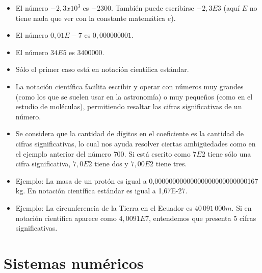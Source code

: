 \documentclass[openany]{book}
\begin{document}
\begin{itemize}
\item
  El número \(-2,3 x 10^3\) es \(-2300\). También puede escribirse \(-2,3E3\) (aquí \(E\) no tiene nada que ver con la constante matemática \(e\)).
\item
  El número \(0,01E-7\) es \(0,000000001\).
\item
  El número \(34E5\) es \(3400000\).
\item
  Sólo el primer caso está en notación científica estándar.
\item
  La notación científica facilita escribir y operar con números muy grandes (como los que se suelen usar en la astronomía) o muy pequeños (como en el estudio de moléculas), permitiendo resaltar las cifras significativas de un número.
\item
  Se considera que la cantidad de dígitos en el coeficiente es la cantidad de cifras significativas, lo cual nos ayuda resolver ciertas ambigüedades como en el ejemplo anterior del número \(700\). Si está escrito como \(7E2\) tiene sólo una cifra significativa, \(7,0E2\) tiene dos y \(7,00E2\) tiene tres.
\item
  Ejemplo: La masa de un protón es igual a 0,00000000000000000000000000167 kg. En notación científica estándar es igual a 1,67E-27.
\item
  Ejemplo: La circunferencia de la Tierra en el Ecuador es \(40 \, 091 \, 000 m\). Si en notación científica aparece como \(4,0091E7\), entendemos que presenta 5 cifras significativas.
\end{itemize}

\hypertarget{sistemas-numuxe9ricos}{%
\section{Sistemas numéricos}\label{sistemas-numuxe9ricos}}
\end{document}
